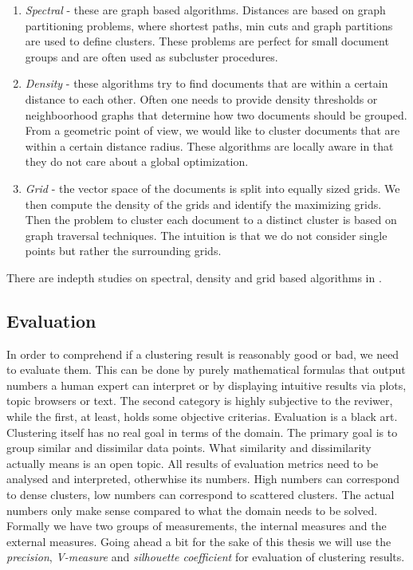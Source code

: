       \begin{enumerate}
        \item \emph{Spectral} - these are graph based algorithms. Distances are based on graph partitioning problems, where shortest paths, min cuts and graph partitions are used to define clusters. These problems are perfect for small document groups and are often used as subcluster procedures.
        \item \emph{Density} - these algorithms try to find documents that are within a certain distance to each other. Often one needs to provide density thresholds or neighboorhood graphs that determine how two documents should be grouped. From a geometric point of view, we would like to cluster documents that are within a certain distance radius. These algorithms are locally aware in that they do not care about a global optimization.
        \item \emph{Grid} - the vector space of the documents is split into equally sized grids. We then compute the density of the grids and identify the maximizing grids. Then the problem to cluster each document to a distinct cluster is based on graph traversal techniques. The intuition is that we do not consider single points but rather the surrounding grids.
      \end{enumerate}

    There are indepth studies on spectral, density and grid based algorithms in \cite{ClusteringBooAggarwalk2013}.

  \subsection{Evaluation}
    In order to comprehend if a clustering result is reasonably good or bad, we need to evaluate them. This can be done by purely mathematical formulas that output numbers a human expert can interpret or by displaying intuitive results via plots, topic browsers or text. The second category is highly subjective to the reviwer, while the first, at least, holds some objective criterias. Evaluation is a black art. Clustering itself has no real goal in terms of the domain. The primary goal is to group similar and dissimilar data points. What similarity and dissimilarity actually means is an open topic. All results of evaluation metrics need to be analysed and interpreted, otherwhise its numbers. High numbers can correspond to dense clusters, low numbers can correspond to scattered clusters. The actual numbers only make sense compared to what the domain needs to be solved.\\
    Formally we have two groups of measurements, the internal measures and the external measures. Going ahead a bit for the sake of this thesis we will use the \emph{precision}, \emph{V-measure} and \emph{silhouette coefficient} for evaluation of clustering results.

